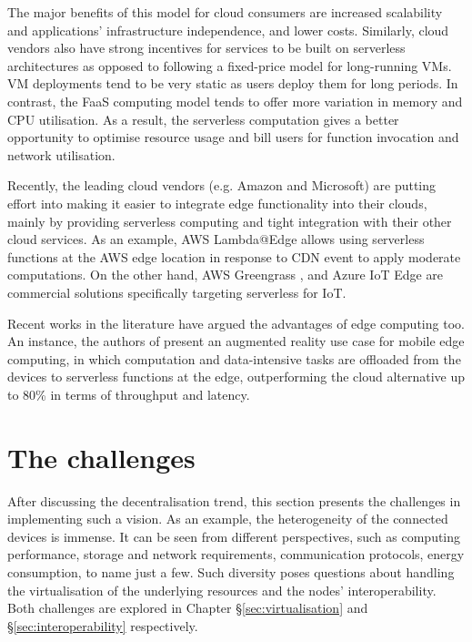 The major benefits of this model for cloud consumers are increased scalability and applications' infrastructure independence, and lower costs. Similarly, cloud vendors also have strong incentives for services to be built on serverless architectures as opposed to following a fixed-price model for long-running VMs. VM deployments tend to be very static as users deploy them for long periods. In contrast, the FaaS computing model tends to offer more variation in memory and CPU utilisation. As a result, the serverless computation gives a better opportunity to optimise resource usage and bill users for function invocation and network utilisation.

Recently, the leading cloud vendors (e.g. Amazon and Microsoft) are putting effort into making it easier to integrate edge functionality into their clouds, mainly by providing serverless computing and tight integration with their other cloud services. As an example, AWS Lambda@Edge \cite{aws-lambda-edge} allows using serverless functions at the AWS edge location in response to CDN event to apply moderate computations. On the other hand, AWS Greengrass \cite{aws-greengrass}, and Azure IoT Edge \cite{azure-iot-edge} are commercial solutions specifically targeting serverless for IoT.

Recent works in the literature have argued the advantages of edge computing too. An instance, the authors of \cite{serverless-mec} present an augmented reality use case for mobile edge computing, in which computation and data-intensive tasks are offloaded from the devices to serverless functions at the edge, outperforming the cloud alternative up to 80\% in terms of throughput and latency.

\section{The challenges}
\label{challenges}

After discussing the decentralisation trend, this section presents the challenges in implementing such a vision. As an example, the heterogeneity of the connected devices is immense. It can be seen from different perspectives, such as computing performance, storage and network requirements, communication protocols, energy consumption, to name just a few. Such diversity poses questions about handling the virtualisation of the underlying resources and the nodes' interoperability. Both challenges are explored in Chapter §\ref{sec:virtualisation} and §\ref{sec:interoperability} respectively.

